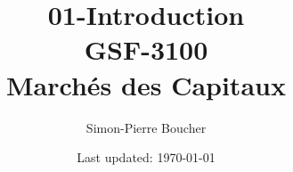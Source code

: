 \documentclass[letterpaper, 12pt]{article}
\newcommand{\1}{\mathds{1}}	%
\theoremstyle{definition}
\begin{document}

\title{01-Introduction \\[1em]
\normalsize GSF-3100 \\ Marchés des Capitaux}


\author{\normalsize Simon-Pierre Boucher}
\date{\normalsize\vspace{-1ex} Last updated: \today}


\maketitle
\tableofcontents\label{sec:contents}


\newpage
\end{document}
